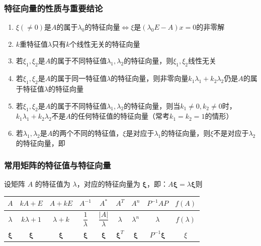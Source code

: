 \documentclass[./linear_algebra.tex]{subfiles}
\begin{document}
    \subsubsection{特征向量的性质与重要结论}

    \begin{enumerate}
        \item $\xi(\neq 0)$是$A$的属于$\lambda_0$的特征向量$\Leftrightarrow \xi$是$(\lambda_{0}E - A)x = 0$的非零解
        \item $k$重特征值$\lambda${\color{red}{至多}}只有$k$个线性无关的特征向量
        \item 若$\xi_1, \xi_2$是$A$的属于不同特征值$\lambda_1, \lambda_2$的特征向量，则$\xi_1, \xi_2$线性无关
        \item 若$\xi_1, \xi_2$是$A$的属于同一特征值$\lambda$的特征向量，则非零向量$k_1\lambda_1 + k_2\lambda_2$仍是$A$的属于特征值$\lambda$的特征向量
        \item 若$\xi_1, \xi_2$是$A$的属于不同特征值$\lambda_1, \lambda_2$的特征向量，则当$k_1 \neq 0, k_2 \neq 0$时，$k_1\lambda_1 + k_2\lambda_2$不是$A$的任何特征值的特征向量（常考$k_1 = k_2 = 1$的情形）
        \item 若$\lambda_1, \lambda_2$是$A$的两个不同的特征值，$\xi$是对应于$\lambda_1$的特征向量，则$\xi$不是对应于$\lambda_2$的特征向量，即{\color{red}{一个向量不能属于两个不同的特征值}}
    \end{enumerate}

    \subsubsection{常用矩阵的特征值与特征向量}
    设矩阵 $A$ 的特征值为 $\lambda$，对应的特征向量为 $\bm{\xi}$，即：$A\bm{\xi} = \lambda \bm{\xi}$则

    \renewcommand{\arraystretch}{2.2} %
    \begin{center}
        \setlength{\tabcolsep}{12pt} %
        \begin{tabular}{c|cccccccc}
            \hline
            \rowcolor{gray!10}
            $A$        & $kA + E$       & $A + kE$      & $A^{-1}$             & $A^{*}$                & $A^{T}$        & $A^{n}$     & $P^{-1}AP$       & $f(A)$       \\
            \hline
            $\lambda$  & $k\lambda + 1$ & $\lambda + k$ & $\dfrac{1}{\lambda}$ & $\dfrac{|A|}{\lambda}$     & $\lambda$ & $\lambda^n$ & $\lambda$  & $f(\lambda)$ \\
            \hline
            $\bm{\xi}$ & $\bm{\xi}$     & $\bm{\xi}$    & $\bm{\xi}$           & $\bm{\xi}$             & $\bm{\xi}^{T}$ & $\bm{\xi}$ & $P^{-1}\bm{\xi}$ & $\xi$  \\
            \hline
        \end{tabular}
    \end{center}
\end{document}
